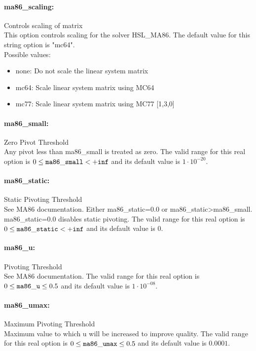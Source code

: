 \paragraph{ma86\_scaling:}\label{opt:ma86_scaling} Controls scaling of matrix \\
 This option controls scaling for the solver
HSL\_MA86. The default value for this string option is "mc64".
\\ 
Possible values:
\begin{itemize}
   \item none: Do not scale the linear system matrix
   \item mc64: Scale linear system matrix using MC64
   \item mc77: Scale linear system matrix using MC77 [1,3,0]
\end{itemize}

\paragraph{ma86\_small:}\label{opt:ma86_small} Zero Pivot Threshold \\
 Any pivot less than ma86\_small is treated as
zero. The valid range for this real option is 
$0 \le {\tt ma86\_small } <  {\tt +inf}$
and its default value is $1 \cdot 10^{-20}$.


\paragraph{ma86\_static:}\label{opt:ma86_static} Static Pivoting Threshold \\
 See MA86 documentation. Either ma86\_static=0.0
or ma86\_static>ma86\_small. ma86\_static=0.0
disables static pivoting. The valid range for this real option is 
$0 \le {\tt ma86\_static } <  {\tt +inf}$
and its default value is $0$.


\paragraph{ma86\_u:}\label{opt:ma86_u} Pivoting Threshold \\
 See MA86 documentation. The valid range for this real option is 
$0 \le {\tt ma86\_u } \le 0.5$
and its default value is $1 \cdot 10^{-08}$.


\paragraph{ma86\_umax:}\label{opt:ma86_umax} Maximum Pivoting Threshold \\
 Maximum value to which u will be increased to
improve quality. The valid range for this real option is 
$0 \le {\tt ma86\_umax } \le 0.5$
and its default value is $0.0001$.


